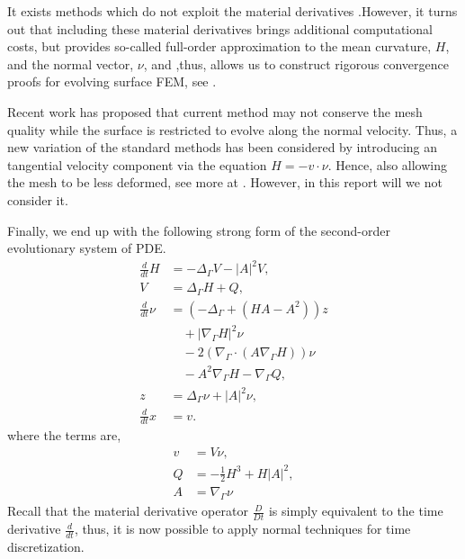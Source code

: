 It exists methods which do not exploit the material derivatives \cite{bonito2010parametric, bartezzaghi2016isogeometric}.However, it turns out that including these material derivatives brings additional computational costs, but provides so-called full-order
approximation to the mean curvature, $H$, and the normal vector, $\nu $, and ,thus, allows us to construct rigorous convergence proofs for evolving surface FEM, see \cite{kovacs2021convergent, binz2022convergent}.

Recent work has proposed that current method may not conserve the mesh quality while the surface is restricted to evolve along the normal velocity. Thus, a new variation of the standard methods has been considered by introducing an tangential
velocity component via the equation  $H = - v\cdot \nu  $. Hence, also allowing the mesh to be less deformed, see more at \cite{hu2022evolving}. However, in this report will we not consider it.

Finally, we end up with the following strong form of the second-order evolutionary system of PDE.
\begin{subequations}
    \label{eq:WE_strong_form}
    \begin{align}
\frac{d}{dt}H & = -  \Delta _{\Gamma }V - \left\lvert A \right\rvert ^2 V    , \\
V  & =   \Delta _{\Gamma } H + Q, \\
\frac{d}{dt} \nu & = \left( -\Delta _{\Gamma } + \left( HA - A^2 \right)  \right) z \nonumber \\
& \quad   + \left\lvert \nabla _{\Gamma } H \right\rvert ^2   \nu \nonumber  \\
 & \quad - 2\left( \nabla _{\Gamma }\cdot \left( A \nabla _{\Gamma } H \right)  \right) \nu \nonumber  \\
  & \quad  -A^2 \nabla _{\Gamma } H  - \nabla _{\Gamma } Q, \\
z & = \Delta  _{\Gamma } \nu  + \left\lvert A \right\rvert ^2 \nu,\\
\frac{d}{dt} x  &= v.
    \end{align}
\end{subequations}
where the terms are,
\[
    \begin{split}
v & = V\nu, \\
Q & =  - \frac{1}{2} H^{3} + H \left\lvert A \right\rvert^2, \\
A & = \nabla _{\Gamma } \nu
    \end{split}
\]
Recall that the material derivative operator $\frac{D}{Dt} $ is simply equivalent to the time derivative $\frac{d}{dt}$, thus, it is now possible to apply normal techniques for time discretization.


